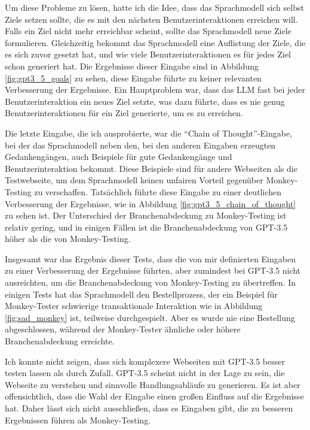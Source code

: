 Um diese Probleme zu lösen, hatte ich die Idee, dass das Sprachmodell sich selbst Ziele setzen sollte, die es mit den nächsten Benutzerinteraktionen erreichen will.
Falls ein Ziel nicht mehr erreichbar scheint, sollte das Sprachmodell neue Ziele formulieren.
Gleichzeitig bekommt das Sprachmodell eine Auflistung der Ziele, die es sich zuvor gesetzt hat, und wie viele Benutzerinteraktionen es für jedes Ziel schon generiert hat.
Die Ergebnisse dieser Eingabe sind in Abbildung \ref{fig:gpt3_5_goals} zu sehen, diese Eingabe führte zu keiner relevanten Verbesserung der Ergebnisse.
Ein Hauptproblem war, dass das LLM fast bei jeder Benutzerinteraktion ein neues Ziel setzte, was dazu führte, dass es nie genug Benutzerinteraktionen für ein Ziel generierte, um es zu erreichen.

Die letzte Eingabe, die ich ausprobierte, war die \enquote{Chain of Thought}-Eingabe, bei der das Sprachmodell neben den, bei den anderen Eingaben erzeugten Gedankengängen, auch Beispiele für gute Gedankengänge und Benutzerinteraktion bekommt.
Diese Beispiele sind für andere Webseiten als die Testwebseite, um dem Sprachmodell keinen unfairen Vorteil gegenüber Monkey-Testing zu verschaffen.
Tatsächlich führte diese Eingabe zu einer deutlichen Verbesserung der Ergebnisse, wie in Abbildung \ref{fig:gpt3_5_chain_of_thought} zu sehen ist.
Der Unterschied der Branchenabdeckung zu Monkey-Testing ist relativ gering, und in einigen Fällen ist die Branchenabdeckung von GPT-3.5 höher als die von Monkey-Testing.

Insgesamt war das Ergebnis dieser Tests, dass die von mir definierten Eingaben zu einer Verbesserung der Ergebnisse führten, aber zumindest bei GPT-3.5 nicht ausreichten, um die Branchenabdeckung von Monkey-Testing zu übertreffen.
In einigen Tests hat das Sprachmodell den Bestellprozess, der ein Beispiel für Monkey-Tester schwierige transaktionale Interaktion wie in Abbildung \ref{fig:sad_monkey} ist, teilweise durchgespielt.
Aber es wurde nie eine Bestellung abgeschlossen, während der Monkey-Tester ähnliche oder höhere Branchenabdeckung erreichte.

Ich konnte nicht zeigen, dass sich komplexere Webseiten mit GPT-3.5 besser testen lassen als durch Zufall.
GPT-3.5 scheint nicht in der Lage zu sein, die Webseite zu verstehen und sinnvolle Handlungsabläufe zu generieren.
Es ist aber offensichtlich, dass die Wahl der Eingabe einen großen Einfluss auf die Ergebnisse hat.
Daher lässt sich nicht ausschließen, dass es Eingaben gibt, die zu besseren Ergebnissen führen als Monkey-Testing.

